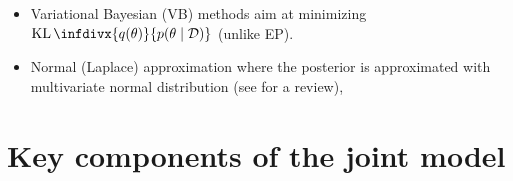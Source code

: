 \documentclass[dissertation,math,vertlayout,pdfa,colorlinks]{aaltoseries}
\newcommand{\bD}{\mathcal{D}}
\DeclareMathOperator{\KLt}{KL}
\newcommand{\KL}{\KLt\infdivx}
\begin{document}
\begin{itemize}
	\item Variational Bayesian (VB) methods aim at minimizing $\KL{q(\theta)}{p(\theta \mid \bD)}$ (unlike EP).
	
	\item Normal (Laplace) approximation where the posterior is approximated with multivariate normal distribution (see \cite[Chapter~4]{Gelman2013} for a review), 
	
 
\end{itemize}

\section{Key components of the joint model}\label{key_comp}





\end{document}
